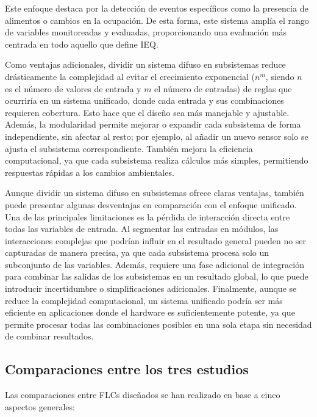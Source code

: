 Este enfoque destaca por la detección de eventos específicos como la presencia de alimentos o cambios en la ocupación. De esta forma, este sistema amplía el rango de variables monitoreadas y evaluadas, proporcionando una evaluación más centrada en todo aquello que define IEQ.

Como ventajas adicionales, dividir un sistema difuso en subsistemas reduce drásticamente la complejidad al evitar el crecimiento exponencial ($n^m$, siendo $n$ es el número de valores de entrada y $m$ el número de entradas) de reglas que ocurriría en un sistema unificado, donde cada entrada y sus combinaciones requieren cobertura. Esto hace que el diseño sea más manejable y ajustable. Además, la modularidad permite mejorar o expandir cada subsistema de forma independiente, sin afectar al resto; por ejemplo, al añadir un nuevo sensor solo se ajusta el subsistema correspondiente. También mejora la eficiencia computacional, ya que cada subsistema realiza cálculos más simples, permitiendo respuestas rápidas a los cambios ambientales.

Aunque dividir un sistema difuso en subsistemas ofrece claras ventajas, también puede presentar algunas desventajas en comparación con el enfoque unificado. Una de las principales limitaciones es la pérdida de interacción directa entre todas las variables de entrada. Al segmentar las entradas en módulos, las interacciones complejas que podrían influir en el resultado general pueden no ser capturadas de manera precisa, ya que cada subsistema procesa solo un subconjunto de las variables. Además, requiere una fase adicional de integración para combinar las salidas de los subsistemas en un resultado global, lo que puede introducir incertidumbre o simplificaciones adicionales. Finalmente, aunque se reduce la complejidad computacional, un sistema unificado podría ser más eficiente en aplicaciones donde el hardware es suficientemente potente, ya que permite procesar todas las combinaciones posibles en una sola etapa sin necesidad de combinar resultados.

\subsection{Comparaciones entre los tres estudios}

Las comparaciones entre FLCs diseñados se han realizado en base a cinco aspectos generales:

